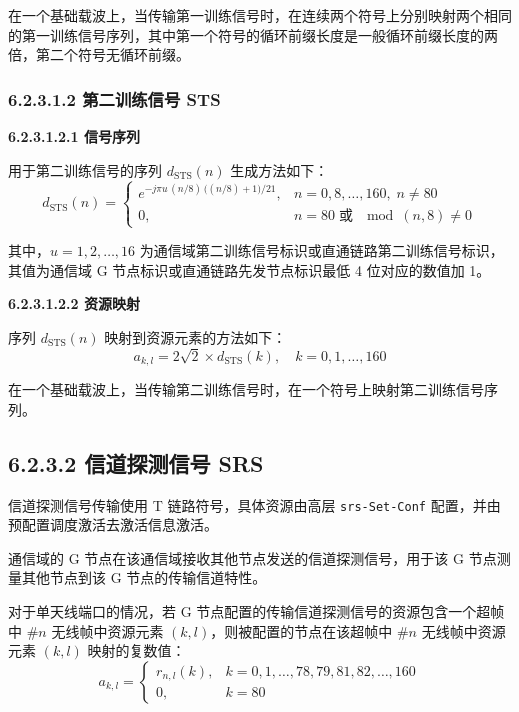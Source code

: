 \documentclass[11pt,a4paper]{ctexart}
\begin{document}
在一个基础载波上，当传输第一训练信号时，在连续两个符号上分别映射两个相同的第一训练信号序列，其中第一个符号的循环前缀长度是一般循环前缀长度的两倍，第二个符号无循环前缀。

\subsubsection{6.2.3.1.2 第二训练信号 STS}

\textbf{6.2.3.1.2.1 信号序列}

用于第二训练信号的序列 $d_{\mathrm{STS}}(n)$ 生成方法如下：
\begin{equation}
d_{\mathrm{STS}}(n) =
\begin{cases}
e^{-j\pi u\, (n/8)\, \bigl((n/8)+1\bigr) / 21}, & n = 0, 8, \ldots, 160,\; n \neq 80 \\[0.3em]
0, & n = 80 \;\text{或}\; \mod(n, 8) \neq 0
\end{cases}
\end{equation}

其中，$u = 1, 2, \ldots, 16$ 为通信域第二训练信号标识或直通链路第二训练信号标识，其值为通信域 G 节点标识或直通链路先发节点标识最低 4 位对应的数值加 1。

\textbf{6.2.3.1.2.2 资源映射}

序列 $d_{\mathrm{STS}}(n)$ 映射到资源元素的方法如下：
\begin{equation}
a_{k,l} = 2\sqrt{2} \times d_{\mathrm{STS}}(k), \quad k = 0, 1, \ldots, 160
\end{equation}

在一个基础载波上，当传输第二训练信号时，在一个符号上映射第二训练信号序列。

\subsection{6.2.3.2 信道探测信号 SRS}

信道探测信号传输使用 T 链路符号，具体资源由高层 \texttt{srs-Set-Conf} 配置，并由预配置调度激活去激活信息激活。

通信域的 G 节点在该通信域接收其他节点发送的信道探测信号，用于该 G 节点测量其他节点到该 G 节点的传输信道特性。

对于单天线端口的情况，若 G 节点配置的传输信道探测信号的资源包含一个超帧中 \#$n$ 无线帧中资源元素 $(k,l)$，则被配置的节点在该超帧中 \#$n$ 无线帧中资源元素 $(k,l)$ 映射的复数值：
\begin{equation}
a_{k,l} =
\begin{cases}
r_{n,l}(k), & k = 0, 1, \ldots, 78, 79, 81, 82, \ldots, 160 \\
0, & k = 80
\end{cases}
\end{equation}
\end{document}
